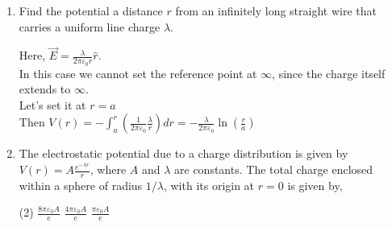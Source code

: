 \begin{enumerate}[label=\color{ocre}\textbf{\arabic*.}]
\begin{answer}
	\end{answer}
	\item  Find the potential a distance $r$ from an infinitely long straight wire that carries a uniform line charge $\lambda$.
	\begin{answer}
		Here, $\vec{E}=\frac{\lambda}{2 \pi \varepsilon_{0} r} \hat{r} .$ \\In this case we cannot set the reference point at $\infty$, since the charge
		itself extends to $\infty$. \\Let's set it at $r=a$
		\\Then $V(r)=-\int_{a}^{r}\left(\frac{1}{2 \pi \varepsilon_{0}} \frac{\lambda}{r}\right) d r=-\frac{\lambda}{2 \pi \varepsilon_{0}} \ln \left(\frac{r}{a}\right)$
	\end{answer}
	\item The electrostatic potential due to a charge distribution is given by $V(r)=A \frac{e^{-\lambda r}}{r}$, where $A$ and $\lambda$ are constants. The total charge enclosed within a sphere of radius $1 / \lambda$, with its origin at $r=0$ is given by,
	\begin{tasks}(2)
		\task[\textbf{a.}]$\frac{8 \pi \varepsilon_{0} A}{e}$  
		\task[\textbf{b.}] $\frac{4 \pi \varepsilon_{0} A}{e}$
		\task[\textbf{c.}]$\frac{\pi \varepsilon_{0} A}{e}$ 
	\end{tasks}
	\begin{answer}
		

\end{answer}
\end{enumerate}
